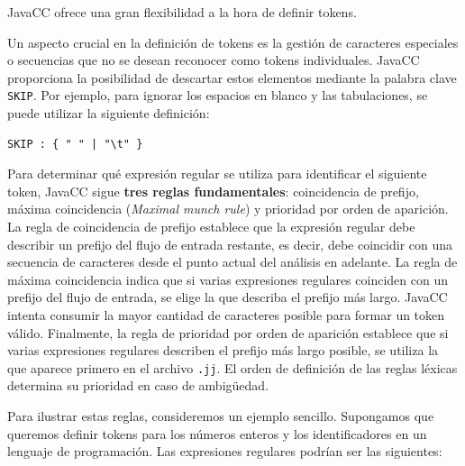 JavaCC ofrece una gran flexibilidad a la hora de definir tokens. 

Un aspecto crucial en la definición de tokens es la gestión de caracteres especiales o secuencias que no se desean reconocer como tokens individuales. JavaCC proporciona la posibilidad de descartar estos elementos mediante la palabra clave \lstinline|SKIP|. Por ejemplo, para ignorar los espacios en blanco y las tabulaciones, se puede utilizar la siguiente definición:

\lstset{inputencoding=utf8/latin1}
\begin{lstlisting}
SKIP : { " " | "\t" }
\end{lstlisting}

Para determinar qué expresión regular se utiliza para identificar el siguiente token, JavaCC sigue \textbf{tres reglas fundamentales}: coincidencia de prefijo, máxima coincidencia (\textit{Maximal munch rule}) y prioridad por orden de aparición. La regla de coincidencia de prefijo establece que la expresión regular debe describir un prefijo del flujo de entrada restante, es decir, debe coincidir con una secuencia de caracteres desde el punto actual del análisis en adelante. La regla de máxima coincidencia indica que si varias expresiones regulares coinciden con un prefijo del flujo de entrada, se elige la que describa el prefijo más largo. JavaCC intenta consumir la mayor cantidad de caracteres posible para formar un token válido. Finalmente, la regla de prioridad por orden de aparición establece que si varias expresiones regulares describen el prefijo más largo posible, se utiliza la que aparece primero en el archivo \lstinline|.jj|. El orden de definición de las reglas léxicas determina su prioridad en caso de ambigüedad.

Para ilustrar estas reglas, consideremos un ejemplo sencillo. Supongamos que queremos definir tokens para los números enteros y los identificadores en un lenguaje de programación. Las expresiones regulares podrían ser las siguientes:

